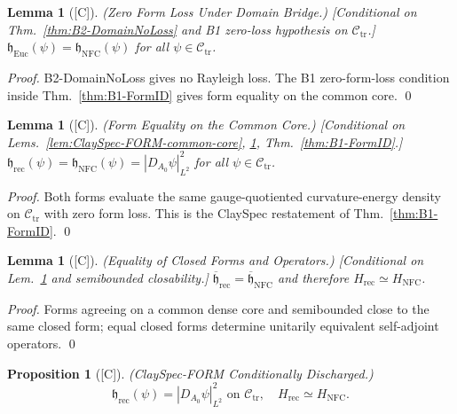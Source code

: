 \documentclass[12pt,oneside]{amsbook}
\theoremstyle{plain}
\newtheorem{lemma}[theorem]{Lemma}
\newtheorem{proposition}[theorem]{Proposition}
\theoremstyle{definition}
\theoremstyle{remark}
\newcommand{\status}[1]{\textup{[#1]}}
\begin{document}
\begin{lemma}[\status{C}]\label{lem:ClaySpec-FORM-zero-loss}
\textup{(Zero Form Loss Under Domain Bridge.)}
\textup{[Conditional on Thm.~\ref{thm:B2-DomainNoLoss} and B1 zero-loss
hypothesis on $\mathcal{C}_{\mathrm{tr}}$.]}
$\mathfrak{h}_{\mathrm{Euc}}(\psi)=\mathfrak{h}_{\mathrm{NFC}}(\psi)$
for all $\psi\in\mathcal{C}_{\mathrm{tr}}$.
\end{lemma}

\begin{proof}
B2-DomainNoLoss gives no Rayleigh loss. The B1 zero-form-loss condition
inside Thm.~\ref{thm:B1-FormID} gives form equality on the common core.
\qed
\end{proof}

\begin{lemma}[\status{C}]\label{lem:ClaySpec-FORM-core-equality}
\textup{(Form Equality on the Common Core.)}
\textup{[Conditional on Lems.~\ref{lem:ClaySpec-FORM-common-core},
\ref{lem:ClaySpec-FORM-zero-loss}, Thm.~\ref{thm:B1-FormID}.]}
$\mathfrak{h}_{\mathrm{rec}}(\psi)=\mathfrak{h}_{\mathrm{NFC}}(\psi)=|D_{A_0}\psi|^2_{L^2}$
for all $\psi\in\mathcal{C}_{\mathrm{tr}}$.
\end{lemma}

\begin{proof}
Both forms evaluate the same gauge-quotiented curvature-energy density
on $\mathcal{C}_{\mathrm{tr}}$ with zero form loss. This is the
ClaySpec restatement of Thm.~\ref{thm:B1-FormID}.
\qed
\end{proof}

\begin{lemma}[\status{C}]\label{lem:ClaySpec-FORM-closure}
\textup{(Equality of Closed Forms and Operators.)}
\textup{[Conditional on Lem.~\ref{lem:ClaySpec-FORM-core-equality}
and semibounded closability.]}
$\overline{\mathfrak{h}}_{\mathrm{rec}}=\overline{\mathfrak{h}}_{\mathrm{NFC}}$
and therefore $H_{\mathrm{rec}}\simeq H_{\mathrm{NFC}}$.
\end{lemma}

\begin{proof}
Forms agreeing on a common dense core and semibounded close to the same
closed form; equal closed forms determine unitarily equivalent
self-adjoint operators.
\qed
\end{proof}

\begin{proposition}[\status{C}]\label{prop:ClaySpec-FORM}
\textup{(ClaySpec-FORM Conditionally Discharged.)}
\[
 \boxed{\mathfrak{h}_{\mathrm{rec}}(\psi)=|D_{A_0}\psi|^2_{L^2}
 \text{ on }\mathcal{C}_{\mathrm{tr}},\quad
 H_{\mathrm{rec}}\simeq H_{\mathrm{NFC}}.}
\]
\end{proposition}
\end{document}
